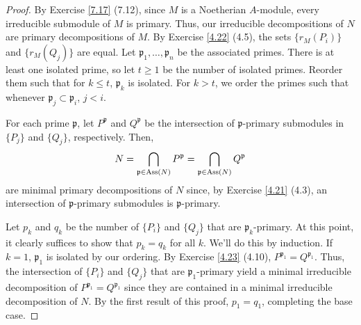 \begin{proof}
By Exercise \ref{7.17} (7.12), since $M$ is a Noetherian $A$-module, every irreducible submodule of $M$ is primary. Thus, our irreducible decompositions of $N$ are primary
decompositions of $M$. By Exercise \ref{4.22} (4.5), the sets $\{r_M(P_i)\}$ and $\{r_M(Q_j)\}$ are equal. Let $\mathfrak{p}_1,\ldots,\mathfrak{p}_n$ be the associated primes. 
There is at least one isolated prime, so let $t \ge 1$ be the number of isolated primes. Reorder them such that for $k \le t$, $\mathfrak{p}_k$ is isolated. For $k > t$, 
we order the primes such that whenever $\mathfrak{p}_j \subset \mathfrak{p}_i$, $j < i$.

For each prime $\mathfrak{p}$, let $P^{\mathfrak{p}}$ and $Q^{\mathfrak{p}}$ be the intersection of $\mathfrak{p}$-primary submodules in $\{P_j\}$ and $\{Q_j\}$, respectively. Then,
$$N = \bigcap_{\mathfrak{p} \in \operatorname{Ass}(N)} P^{\mathfrak{p}} = \bigcap_{\mathfrak{p} \in \operatorname{Ass}(N)} Q^{\mathfrak{p}}$$
are minimal primary decompositions of $N$ since, by Exercise \ref{4.21} (4.3), an intersection of $\mathfrak{p}$-primary submodules is $\mathfrak{p}$-primary.

Let $p_k$ and $q_k$ be the number of $\{P_i\}$ and $\{Q_j\}$ that are $\mathfrak{p}_k$-primary. At this point, it clearly suffices to show that $p_k = q_k$ for all $k$. We'll do 
this by induction. If $k = 1$, $\mathfrak{p}_1$ is isolated by our ordering. By Exercise \ref{4.23} (4.10), $P^{\mathfrak{p}_1} = Q^{\mathfrak{p}_1}$. Thus, the intersection of 
$\{P_i\}$ and $\{Q_j\}$ that are $\mathfrak{p}_1$-primary yield a minimal irreducible decomposition of $P^{\mathfrak{p}_1} = Q^{\mathfrak{p}_1}$ since they are contained in 
a minimal irreducible decomposition of $N$. By the first result of this proof, $p_1 = q_1$, completing the base case.


\end{proof}

